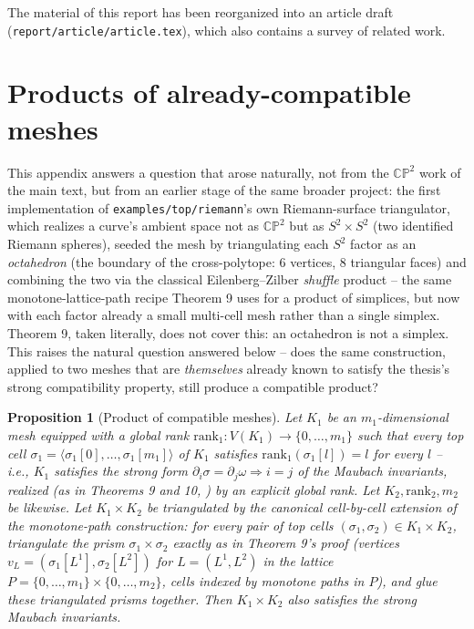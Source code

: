 \documentclass[11pt]{article}
\newtheorem*{propthm}{Proposition}
\newcommand{\CP}{\mathbb{CP}}
\begin{document}
The material of this report has been reorganized into an article draft
(\nolinkurl{report/article/article.tex}), which also contains a survey of
related work.

\appendix
\section{Products of already-compatible meshes}
\label{app:product}

This appendix answers a question that arose naturally, not from the $\CP^2$
work of the main text, but from an earlier stage of the same broader
project: the first implementation of \texttt{examples/top/riemann}'s own
Riemann-surface triangulator, which realizes a curve's ambient space not
as $\CP^2$ but as $S^2\times S^2$ (two identified Riemann spheres), seeded
the mesh by triangulating each $S^2$ factor as an \emph{octahedron} (the
boundary of the cross-polytope: 6 vertices, 8 triangular faces) and
combining the two via the classical Eilenberg--Zilber \emph{shuffle}
product -- the same monotone-lattice-path recipe Theorem 9 uses for a
product of simplices, but now with each factor already a small
multi-cell mesh rather than a single simplex. Theorem 9, taken literally,
does not cover this: an octahedron is not a simplex. This raises the
natural question answered below -- does the same construction, applied to
two meshes that are \emph{themselves} already known to satisfy the
thesis's strong compatibility property, still produce a compatible
product?

\begin{propthm}[Product of compatible meshes]
\label{prop:product}
Let $K_1$ be an $m_1$-dimensional mesh equipped with a \emph{global rank}
$\mathrm{rank}_1:V(K_1)\to\{0,\dots,m_1\}$ such that every top cell
$\sigma_1=\langle\sigma_1[0],\dots,\sigma_1[m_1]\rangle$ of $K_1$ satisfies
$\mathrm{rank}_1(\sigma_1[l])=l$ for every $l$ -- i.e., $K_1$ satisfies the
strong form $\partial_i\sigma=\partial_j\omega\Rightarrow i=j$ of the
Maubach invariants, realized (as in Theorems 9 and 10, )
by an explicit global rank. Let $K_2,\mathrm{rank}_2,m_2$ be likewise. Let
$K_1\times K_2$ be triangulated by the canonical cell-by-cell extension of
the monotone-path construction: for every pair of top cells
$(\sigma_1,\sigma_2)\in K_1\times K_2$, triangulate the prism
$\sigma_1\times\sigma_2$ exactly as in Theorem 9's proof (vertices
$v_L=(\sigma_1[L^1],\sigma_2[L^2])$ for $L=(L^1,L^2)$ in the lattice
$P=\{0,\dots,m_1\}\times\{0,\dots,m_2\}$, cells indexed by monotone paths
in $P$), and glue these triangulated prisms together. Then $K_1\times
K_2$ also satisfies the strong Maubach invariants.
\end{propthm}
\end{document}
